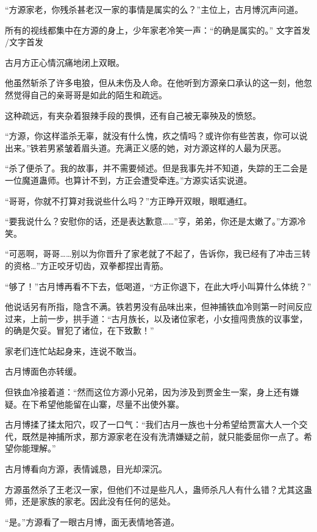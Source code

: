 
\begin{this_body}

“方源家老，你残杀甚老汉一家的事情是属实的么？”主位上，古月博沉声问道。

所有的视线都集中在方源的身上，少年家老冷笑一声：“的确是属实的。” 文字首发 /文字首发

古月方正心情沉痛地闭上双眼。

他虽然斩杀了许多电狼，但从未伤及人命。在他听到方源亲口承认的这一刻，他忽然觉得自己的亲哥哥是如此的陌生和疏远。

这种疏远，有夹杂着狠辣手段的畏惧，还有自己被无辜殃及的愤怒。

“方源，你这样滥杀无辜，就没有什么愧，疚之情吗？或许你有些苦衷，你可以说出来。”铁若男紧皱着眉头道。充满正义感的她，对方源这样的人最为厌恶。

“杀了便杀了。我的故事，并不需要倾述。但是我事先并不知道，失踪的王二会是一位魔道蛊师。也算计不到，方正会遭受牵连。”方源实话实说道。

“哥哥，你就不打算对我说些什么吗？”方正睁开双眼，眼眶通红。

“要我说什么？安慰你的话，还是表达歉意……”亨，弟弟，你还是太嫩了。”方源冷笑。

“可恶啊，哥哥……别以为你晋升了家老就了不起了，告诉你，我已经有了冲击三转的资格…”方正咬牙切齿，双拳都捏出青筋。

“够了！”古月博再看不下去，低喝道，“方正你退下，在此大呼小叫算什么体统？”

他说话另有所指，隐含不满。铁若男没有品味出来，但神捕铁血冷则第一时间反应过来，上前一步，拱手道：“古月族长，以及诸位家老，小女擅闯贵族的议事堂，的确是欠妥。冒犯了诸位，在下致歉！”

家老们连忙站起身来，连说不敢当。

古月博面色亦转缓。

但铁血冷接着道：“然而这位方源小兄弟，因为涉及到贾金生一案，身上还有嫌疑。在下希望他能留在山寨，尽量不出使外寨。

古月博揉了揉太阳穴，叹了一口气：“我们古月一族也十分希望给贾富大人一个交代，既然是神捕所求，那方源家老在没有洗清嫌疑之前，就只能委屈你一点了。希望你能理解。”

古月博看向方源，表情诚恳，目光却深沉。

方源虽然杀了王老汉一家，但他们不过是些凡人，蛊师杀凡人有什么错？尤其这蛊师，还是家族的家老。因此没有任何的惩处。

“是。”方源看了一眼古月博，面无表情地答道。


\end{this_body}
